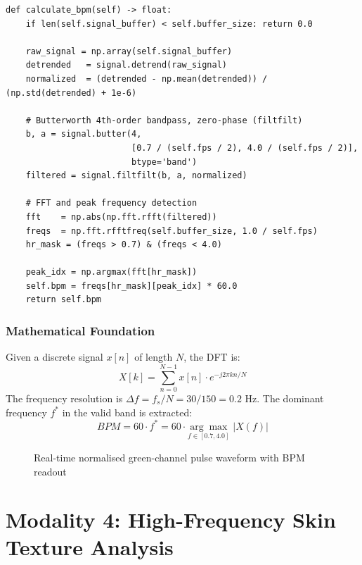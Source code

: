 \documentclass[12pt,a4paper]{report}
\begin{document}
\begin{lstlisting}[style=pythonstyle, caption={Signal Pre-processing and BPM Extraction}]
def calculate_bpm(self) -> float:
    if len(self.signal_buffer) < self.buffer_size: return 0.0

    raw_signal = np.array(self.signal_buffer)
    detrended   = signal.detrend(raw_signal)
    normalized  = (detrended - np.mean(detrended)) / (np.std(detrended) + 1e-6)

    # Butterworth 4th-order bandpass, zero-phase (filtfilt)
    b, a = signal.butter(4,
                         [0.7 / (self.fps / 2), 4.0 / (self.fps / 2)],
                         btype='band')
    filtered = signal.filtfilt(b, a, normalized)

    # FFT and peak frequency detection
    fft    = np.abs(np.fft.rfft(filtered))
    freqs  = np.fft.rfftfreq(self.buffer_size, 1.0 / self.fps)
    hr_mask = (freqs > 0.7) & (freqs < 4.0)

    peak_idx = np.argmax(fft[hr_mask])
    self.bpm = freqs[hr_mask][peak_idx] * 60.0
    return self.bpm
\end{lstlisting}

\subsection{Mathematical Foundation}
Given a discrete signal $x[n]$ of length $N$, the DFT is:
\[
X[k] = \sum_{n=0}^{N-1} x[n] \cdot e^{-j2\pi kn/N}
\]
The frequency resolution is $\Delta f = f_s / N = 30/150 = 0.2$ Hz. The dominant frequency $f^*$ in the valid band is extracted:
\[
BPM = 60 \cdot f^* = 60 \cdot \underset{f \in [0.7, 4.0]}{\arg\max} \; |X(f)|
\]

\begin{figure}[H]
    \centering
    \caption{Real-time normalised green-channel pulse waveform with BPM readout}
    \label{fig:rppg}
\end{figure}

\chapter{Modality 4: High-Frequency Skin Texture Analysis}
\end{document}

